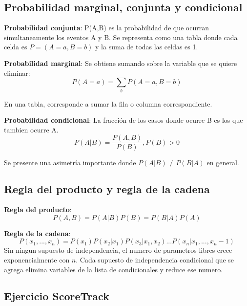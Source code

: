 \subsection{Probabilidad marginal, conjunta y condicional}

\begin{definition}
    \textbf{Probabilidad conjunta}: P(A,B) es la probabilidad de que ocurran simultaneamente los eventos A y B. Se representa como una tabla 
    donde cada celda es $P=(A=a,B=b)$ y la suma de todas las celdas es 1.
\end{definition}

\begin{definition}
    \textbf{Probabilidad marginal}: Se obtiene sumando sobre la variable que se quiere eliminar:
    \[
        P(A=a) = \sum_{b} P(A=a, B=b)
    \]
\end{definition}

En una tabla, corresponde a sumar la fila o columna correspondiente.

\begin{definition}
    \textbf{Probabilidad condicional}: La fracción de los casos donde ocurre B es los que tambien ocurre A.
    \[
        P(A|B) = \frac{P(A,B)}{P(B)}, P(B)>0
    \]
\end{definition}

Se presente una asimetría importante donde $P(A|B) \neq P(B|A)$ en general. 

\subsection{Regla del producto y regla de la cadena}

\begin{theorem}
    \textbf{Regla del producto}: 
    \[
        P(A,B) = P(A|B)P(B) = P(B|A)P(A)
    \]
\end{theorem}

\begin{theorem}
    \textbf{Regla de la cadena}: 
    \[
        P(x_1, ..., x_n) = P(x_1)P(x_2|x_1)P(x_3|x_1,x_2) ... P(x_n|x_1,...,x_n-1)
    \]
    Sin ningun supuesto de independencia, el numero de parametros libres crece exponencialmente con $n$. Cada supuesto
    de independencia condicional que se agrega elimina variables de la lista de condicionales y reduce ese numero.
\end{theorem}

\subsection{Ejercicio ScoreTrack}

